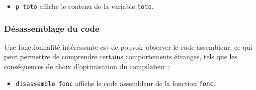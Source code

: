 \begin{itemize}
   \item {\tt p toto} affiche le contenu de la variable {\tt toto}.
\end{itemize}

%
\subsubsection{Désassemblage du code}

    Une fonctionnalité intéressante est de pouvoir observer le code
assembleur, ce qui peut permettre de comprendre certains comportements
étranges, tels que les conséquences de choix d'optimisation du
compilateur :

\begin{itemize}
   \item {\tt disassemble fonc} affiche le code assembleur de la
     fonction {\tt fonc}.
\end{itemize}

